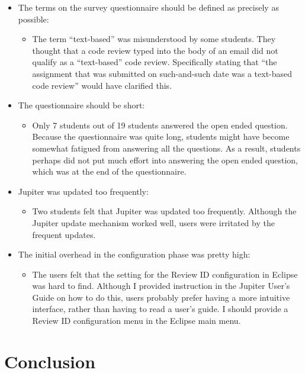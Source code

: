\begin{itemize}
	\item The terms on the survey questionnaire should be defined as precisely as possible:
		\begin{itemize}
			\item The term ``text-based'' was misunderstood by some students. They thought that a code review typed into the body of an email did not qualify as a ``text-based'' code review. Specifically stating that ``the assignment that was submitted on such-and-such date was a text-based code review'' would have clarified this.
		\end{itemize}
	\item The questionnaire should be short:
		\begin{itemize}
			\item Only 7 students out of 19 students answered the open ended question. Because the questionnaire was quite long, students might have become somewhat fatigued from answering all the questions. As a result, students perhaps did not put much effort into answering the open ended question, which was at the end of the questionnaire.
		\end{itemize}
	\item Jupiter was updated too frequently:
		\begin{itemize}
			\item Two students felt that Jupiter was updated too frequently. Although the Jupiter update mechanism worked well, users were irritated by the frequent updates.
		\end{itemize}
	\item The initial overhead in the configuration phase was pretty high:	
		\begin{itemize}
			\item The users felt that the setting for the Review ID configuration in Eclipse was hard to find. Although I provided instruction in the Jupiter User's Guide on how to do this, users probably prefer having a more intuitive interface, rather than having to read a user's guide. I should provide a Review ID configuration menu in the Eclipse main menu.
		\end{itemize}
\end{itemize}

\chapter{Conclusion}
\label{ch:conclusion}

